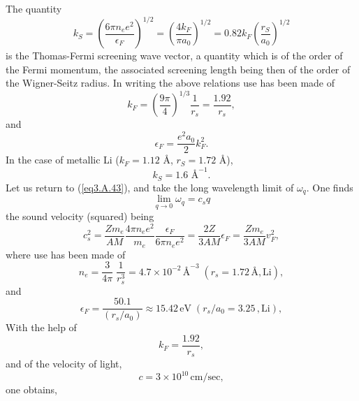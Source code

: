 \begin{subappendices}
\begin{equation}
\end{equation}
The quantity
\begin{equation}\label{eq3.A.43}
k_S=\left(\frac{6\pi n_ee^2}{\epsilon_F}\right)^{1/2}=\left(\frac{4k_F}{\pi a_0}\right)^{1/2}=0.82 k_F\left(\frac{r_S}{a_0}\right)^{1/2}
\end{equation}
is the Thomas-Fermi screening wave vector, a quantity which is of the order of the Fermi momentum, the associated screening length being then of the order of the Wigner-Seitz radius. In writing the above relations use has been made of
\begin{equation}\label{eq3.A.44b}
k_F=\left(\frac{9\pi}{4}\right)^{1/3}\frac{1}{r_s}=\frac{1.92}{r_s},
\end{equation}
and
\begin{equation}\label{eq3.A.44}
\epsilon_F=\frac{e^2a_0}{2}k_F^2.
\end{equation}
 In the case of metallic Li ($k_F=1.12$ \AA, $r_S=1.72$ \AA),
\begin{equation}\label{eq3.A.45}
k_S=1.6\text{ \AA}^{-1}.
\end{equation}
 Let us return to (\ref{eq3.A.43}), and take the long wavelength limit of $\omega_q$. One finds
\begin{equation}\label{eq3.A.46}
\lim_{q\to0}\omega_q=c_sq
\end{equation}
 the sound velocity (squared) being 
\begin{equation}\label{eqC2AppA8}
c_s^2=\frac{Zm_e}{AM}\frac{4\pi n_ee^2}{m_e}\frac{\epsilon_F}{6\pi n_e e^2}=\frac{2Z}{3 AM}\epsilon_F=\frac{Zm_e}{3 AM}v_F^2,
\end{equation}
where use has been made of
\begin{equation}\label{eqC2AppA56}
n_e=\frac{3}{4\pi}\;\frac{1}{r_s^3}=4.7\times10^{-2}\,\text{\AA}^{-3}\;(r_s=1.72\,\text{\AA},\text{Li}),
\end{equation}
and
\begin{equation}\label{eqC2AppA57}
\epsilon_F=\frac{50.1}{(r_s/a_0)}\approx 15.42\,\text{eV}\;(r_s/a_0=3.25\,,\text{Li}),
\end{equation}
With the help of
\begin{equation}\label{eqC2AppA9}
k_F=\frac{1.92}{r_s},
\end{equation}
 and of the velocity of light,
\begin{equation}\label{eqC2AppA10}
c=3\times 10^{10}\,\text{cm/sec},
\end{equation}
one obtains,
\begin{align}\label{eqC2AppA11}

\end{align}
\end{subappendices}
